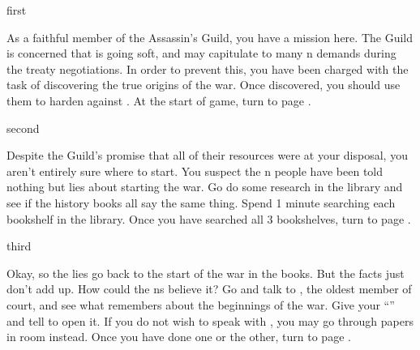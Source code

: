 \documentclass[greennotebook]{NeptuneBall}
\begin{document}
\startnotebook{\nWar{}}

\begin{page}{first}

As a faithful member of the Assassin's Guild, you have a mission here. The Guild is concerned that \cPrince{} is going soft, and may capitulate to many \pAtlantis{}n demands during the treaty negotiations. In order to prevent this, you have been charged with the task of discovering the true origins of the war. Once discovered, you should use them to harden \cPrince{} against \pAtlantis{}. At the start of game, turn to page .

\end{page}

\begin{page}{second}

Despite the Guild's promise that all of their resources were at your disposal, you aren't entirely sure where to start. You suspect the \pAtlantis{}n people have been told nothing but lies about \pPacifica{} starting the war. Go do some research in the library and see if the history books all say the same thing. Spend 1 minute searching each bookshelf in the library. Once you have searched all 3 bookshelves, turn to page .

\end{page}

\begin{page}{third}

Okay, so the lies go back to the start of the war in the books. But the facts just don't add up. How could the \pAtlantis{}ns believe it? Go and talk to \cManta{}, the oldest member of court, and see what \cManta{\they} remembers about the beginnings of the war. Give \cManta{\them} your ``\mWPacket{\MYname}'' and tell \cManta{\them} to open it. If you do not wish to speak with \cManta{}, you may go through \cManta{\their} papers in \cManta{\their} room instead. Once you have done one or the other, turn to page .

\end{page}
\end{document}

